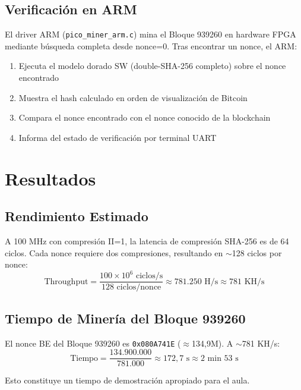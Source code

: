 \documentclass[12pt,a4paper]{article}
\begin{document}
\subsection{Verificaci\'on en ARM}

El driver ARM (\texttt{pico\_miner\_arm.c}) mina el Bloque 939260 en hardware FPGA
mediante b\'usqueda completa desde nonce=0. Tras encontrar un nonce, el ARM:
\begin{enumerate}[leftmargin=2em]
    \item Ejecuta el modelo dorado SW (double-SHA-256 completo) sobre el nonce encontrado
    \item Muestra el hash calculado en orden de visualizaci\'on de Bitcoin
    \item Compara el nonce encontrado con el nonce conocido de la blockchain
    \item Informa del estado de verificaci\'on por terminal UART
\end{enumerate}

\section{Resultados}

\subsection{Rendimiento Estimado}

A 100 MHz con compresi\'on II=1, la latencia de compresi\'on SHA-256 es de 64 ciclos.
Cada nonce requiere dos compresiones, resultando en $\sim$128 ciclos por nonce:
\[
    \text{Throughput} = \frac{100 \times 10^6 \text{ ciclos/s}}{128 \text{ ciclos/nonce}}
    \approx 781.250 \text{ H/s} \approx 781 \text{ KH/s}
\]

\subsection{Tiempo de Miner\'ia del Bloque 939260}

El nonce BE del Bloque 939260 es \texttt{0x080A741E} ($\approx$134,9M).
A $\sim$781 KH/s:
\[
    \text{Tiempo} = \frac{134.900.000}{781.000} \approx 172,7 \text{ s}
    \approx 2 \text{ min } 53 \text{ s}
\]

Esto constituye un tiempo de demostraci\'on apropiado para el aula.
\end{document}
